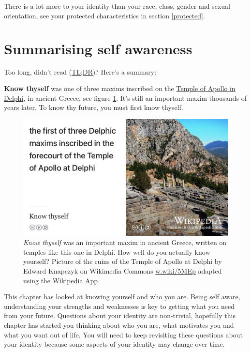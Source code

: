 \documentclass[
]{book}
\begin{document}
There is a lot more to your identity than your race, class, gender and sexual orientation, see your protected characteristics in section \ref{protected}.

\hypertarget{tldr2}{%
\section{Summarising self awareness}\label{tldr2}}

Too long, didn't read (\href{https://en.wiktionary.org/wiki/too_long;_didn\%27t_read}{TL;DR})? Here's a summary:

\textbf{Know thyself} was one of three maxims inscribed on the \href{https://en.wikipedia.org/wiki/Temple_of_Apollo_(Delphi)}{Temple of Apollo in Delphi}, in ancient Greece, see figure \ref{fig:delphi-fig}. It's still an important maxim thousands of years later. To know thy future, you must first know thyself.

\begin{figure}

{\centering \includegraphics[width=1\linewidth]{images/know-thyself-delphi} 

}

\caption{\emph{Know thyself} was an important maxim in ancient Greece, written on temples like this one in Delphi. How well do you actually know yourself? Picture of the ruins of the Temple of Apollo at Delphi by Edward Knapczyk on Wikimedia Commons \href{https://w.wiki/5MEp}{w.wiki/5MEp} adapted using the \href{https://apps.apple.com/gb/app/wikipedia/id324715238}{Wikipedia App}}\label{fig:delphi-fig}
\end{figure}



This chapter has looked at knowing yourself and who you are. Being self aware, understanding your strengths and weaknesses is key to getting what you need from your future. Questions about your identity are non-trivial, hopefully this chapter has started you thinking about who you are, what motivates you and what you want out of life. You will need to keep revisiting these questions about your identity because some aspects of your identity may change over time.
\end{document}
